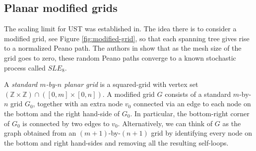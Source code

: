 \documentclass[preprint,12pt]{elsarticle}
\theoremstyle{definition}
\theoremstyle{remark}
\numberwithin{equation}{section}
\begin{document}
\subsection{Planar modified grids}\label{sec:modified-grid}


The scaling limit for UST was established in\cite{lawler-schramm-werner2002}.  The idea there is to consider a modified grid, see Figure \ref{fig:modified-grid}, so that each spanning tree gives rise to a normalized Peano path. The authors in \cite{lawler-schramm-werner2002}  show that as the mesh size of the grid goes to zero, these random Peano paths converge to a known stochastic process called $SLE_8$. 


A {\it standard $m$-by-$n$ planar grid} is a squared-grid with vertex set
$ \left(\mathbb{Z} \times \mathbb{Z}\right) \cap \left([0,  m] \times [0,  n] \right).$
A modified grid $G$ consists of a standard $m$-by-$n$ grid $G_0$, together with an extra node $v_0$ connected via an edge to each node on the bottom and the right hand-side of $G_0$. In particular, the bottom-right corner of $G_0$ is connected by two edges to $v_0$. Alternatively, we can think of $G$ as the graph obtained from an $(m+1)$-by-$(n+1)$ grid by identifying every node on the bottom and right hand-sides and removing all the resulting self-loops.
\end{document}
